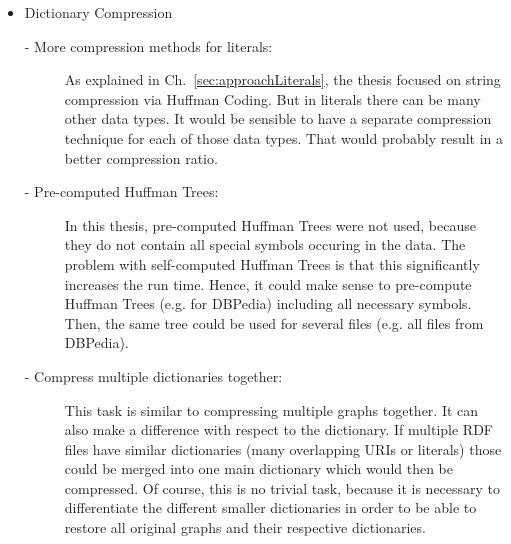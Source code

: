 \begin{itemize}
\begin{description}
	\end{description}
	\item Dictionary Compression
	\begin{description}
		\item [- More compression methods for literals:] As explained in Ch.~\ref{sec:approachLiterals}, the thesis focused on string compression via Huffman Coding. But in literals there can be many other data types. It would be sensible to have a separate compression technique for each of those data types. That would probably result in a better compression ratio.
		\item[- Pre-computed Huffman Trees:] In this thesis, pre-computed Huffman Trees were not used, because they do not contain all special symbols occuring in the data. The problem with self-computed Huffman Trees is that this significantly increases the run time. Hence, it could make sense to pre-compute Huffman Trees (e.g. for DBPedia) including all necessary symbols. Then, the same tree could be used for several files (e.g. all files from DBPedia).
		\item[- Compress multiple dictionaries together:] This task is similar to compressing multiple graphs together. It can also make a difference with respect to the dictionary. If multiple RDF files have similar dictionaries (many overlapping URIs or literals) those could be merged into one main dictionary which would then be compressed. Of course, this is no trivial task, because it is necessary to differentiate the different smaller dictionaries in order to be able to restore all original graphs and their respective dictionaries.
	\end{description}
\end{itemize}


